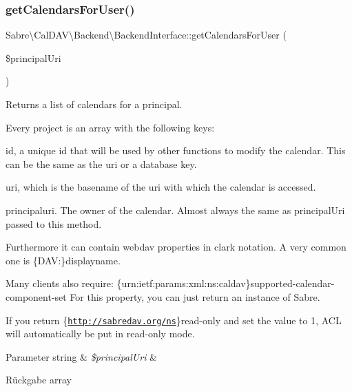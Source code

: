 \mbox{\label{interface_sabre_1_1_cal_d_a_v_1_1_backend_1_1_backend_interface_a41d069c48af0155b8e6e04bee46c70ba}} 
\subsubsection{\texorpdfstring{get\+Calendars\+For\+User()}{getCalendarsForUser()}}
{\footnotesize\ttfamily Sabre\textbackslash{}\+Cal\+D\+A\+V\textbackslash{}\+Backend\textbackslash{}\+Backend\+Interface\+::get\+Calendars\+For\+User (\begin{DoxyParamCaption}\item[{}]{\$principal\+Uri }\end{DoxyParamCaption})}

Returns a list of calendars for a principal.

Every project is an array with the following keys\+:
\begin{DoxyItemize}
\item id, a unique id that will be used by other functions to modify the calendar. This can be the same as the uri or a database key.
\item uri, which is the basename of the uri with which the calendar is accessed.
\item principaluri. The owner of the calendar. Almost always the same as principal\+Uri passed to this method.
\end{DoxyItemize}

Furthermore it can contain webdav properties in clark notation. A very common one is \textquotesingle{}\{D\+AV\+:\}displayname\textquotesingle{}.

Many clients also require\+: \{urn\+:ietf\+:params\+:xml\+:ns\+:caldav\}supported-\/calendar-\/component-\/set For this property, you can just return an instance of Sabre.

If you return \{\href{http://sabredav.org/ns}{\tt http\+://sabredav.\+org/ns}\}read-\/only and set the value to 1, A\+CL will automatically be put in read-\/only mode.


\begin{DoxyParams}[1]{Parameter}
string & {\em \$principal\+Uri} & \\
\hline
\end{DoxyParams}
\begin{DoxyReturn}{Rückgabe}
array 
\end{DoxyReturn}


